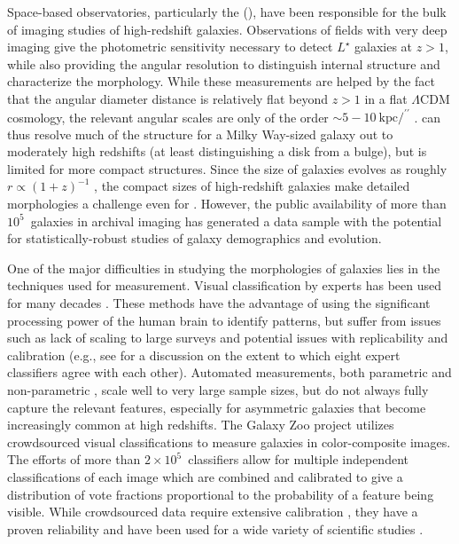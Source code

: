 \documentclass[twocolumn]{aastex6}
\begin{document}
Space-based observatories, particularly the \hubble{} (\hst), have been
responsible for the bulk of imaging studies of high-redshift galaxies.
Observations of fields with very deep imaging
\citep[eg,][]{wil96,gia04,bec06,dav07,sco07,gro11} give the photometric
sensitivity necessary to detect $L^\star$ galaxies at $z>1$, while also
providing the angular resolution to distinguish internal structure and
characterize the morphology. While these measurements are helped by the fact
that the angular diameter distance is relatively flat beyond $z>1$ in a flat
$\Lambda$CDM cosmology, the relevant angular scales are only of the order
$\sim5-10~\mathrm{kpc}/^{\prime\prime}$ \citep{wri06}. \hst{} can thus resolve
much of the structure for a Milky Way-sized galaxy out to moderately high
redshifts (at least distinguishing a disk from a bulge), but is limited for
more compact structures. Since the size of galaxies evolves as roughly
$r\propto(1+z)^{-1}$ \citep{mao98,law12a}, the compact sizes of high-redshift
galaxies make detailed morphologies a challenge even for \hst{} \citep{che12}.
However, the public availability of more than $10^5$~galaxies in archival
imaging has generated a data sample with the potential
for statistically-robust studies of galaxy demographics and evolution. 

One of the major difficulties in studying the morphologies of galaxies lies in
the techniques used for measurement. Visual classification by experts has been
used for many decades \citep[eg,][]{hub26,dev59,san61,van76,nai10,bai11,kar15}.
These methods have the advantage of using the significant processing power of
the human brain to identify patterns, but suffer from issues such as lack of
scaling to large surveys and potential issues with replicability and
calibration (e.g., see \citealt{lah95} for a discussion on the extent to which
eight expert classifiers agree with each other). Automated measurements, both
parametric \citep{pen02a,sim11,lac12} and non-parametric
\citep{abr03,con03,lot04,sca07,bam08,fre13}, scale well to very large sample
sizes, but do not always fully capture the relevant features, especially for
asymmetric galaxies that become increasingly common at high redshifts. The
Galaxy Zoo project \citep{lin08,for12} utilizes crowdsourced visual classifications
to measure galaxies in color-composite images. The efforts of more than
$2\times10^5$~classifiers allow for multiple independent classifications of
each image which are combined and calibrated to give a distribution of vote
fractions proportional to the probability of a feature being visible. While
crowdsourced data require extensive calibration \citep{bam09,wil13}, they have
a proven reliability and have been used for a wide variety of scientific
studies \citep[eg,][]{lan08,bam09,dar10,mas11c,ski12,sim13,sch14,wil15}. 
\end{document}

